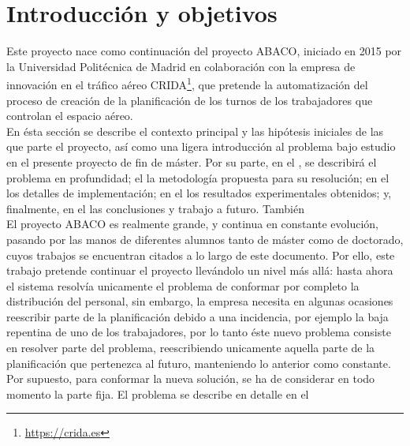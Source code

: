 \graphicspath{{capitulos/Capitulo1-Introduccion/recursos/}}


\section{Introducción y objetivos}

Este proyecto nace como continuación del proyecto ABACO, iniciado en 2015 por la Universidad Politécnica de Madrid en
colaboración con la empresa de innovación en el tráfico aéreo CRIDA\footnote{\url{https://crida.es}}, que pretende la
automatización del proceso de creación de la planificación de los turnos de los trabajadores que controlan el espacio aéreo.
\\

En ésta sección se describe el contexto principal y las hipótesis iniciales de las que parte el proyecto, así como una
ligera introducción al problema bajo estudio en el presente proyecto de fin de máster. Por su parte, en el
, se describirá el problema en profundidad; el 
la metodología propuesta para su resolución; en el  los detalles de implementación;
en el  los resultados experimentales obtenidos; y, finalmente, en el
 las conclusiones y trabajo a futuro. También  %
\\

El proyecto ABACO es realmente grande, y continua en constante evolución, pasando por las manos de diferentes alumnos
tanto de máster como de doctorado, cuyos trabajos se encuentran citados a lo largo de este documento. Por ello, este
trabajo pretende continuar el proyecto llevándolo un nivel más allá: hasta ahora el sistema resolvía unicamente el
problema de conformar por completo la distribución del personal, sin embargo, la empresa necesita en algunas ocasiones
reescribir parte de la planificación debido a una incidencia, por ejemplo la baja repentina de uno de los trabajadores,
por lo tanto éste nuevo problema consiste en resolver parte del problema, reescribiendo unicamente aquella parte de la
planificación que pertenezca al futuro, manteniendo lo anterior como constante. Por supuesto, para conformar la nueva
solución, se ha de considerar en todo momento la parte fija. El problema se describe en detalle en el 
\\

